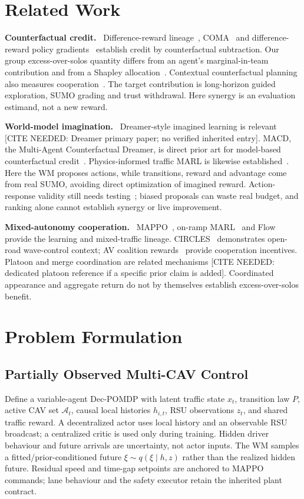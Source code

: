 \documentclass[conference]{IEEEtran}
\newcommand{\citeneeded}[1]{\textcolor{red!80!black}{[CITE NEEDED: #1]}}
\newcommand{\para}[1]{\noindent\textbf{#1}\ }
\begin{document}
\section{Related Work}
\para{Counterfactual credit.}
Difference-reward lineage~\cite{wolpert_tumer2002}, COMA~\cite{foerster_coma2018}
and difference-reward policy gradients~\cite{castellini_drreinforce}
establish credit by counterfactual subtraction. Our group excess-over-solos
quantity differs from an agent's marginal-in-team contribution and from a
Shapley allocation~\cite{han_shapley2022}. Contextual counterfactual planning
also measures cooperation~\cite{barnett_counterfactual2026}. The target
contribution is long-horizon guided exploration, SUMO grading and trust
withdrawal. Here synergy is an evaluation estimand, not a new reward.

\para{World-model imagination.}
Dreamer-style imagined learning is relevant
\citeneeded{Dreamer primary paper; no verified inherited entry}.
MACD, the Multi-Agent Counterfactual Dreamer, is direct prior art for
model-based counterfactual credit~\cite{chai_macd2024}.
Physics-informed traffic MARL is likewise established~\cite{liu_physics_wm2026}.
Here the WM proposes actions, while transitions, reward and advantage come
from real SUMO, avoiding direct optimization of imagined reward.
Action-response validity still needs testing~\cite{oefinger_validate2026};
biased proposals can waste real budget, and ranking alone cannot establish
synergy or live improvement.

\para{Mixed-autonomy cooperation.}
MAPPO~\cite{yu_mappo2022}, on-ramp MARL~\cite{chen_merge2021} and
Flow~\cite{wu_flow2022} provide the learning and mixed-traffic lineage.
CIRCLES~\cite{lee_circles2024} demonstrates open-road wave-control context;
AV coalition rewards~\cite{han_shapley2022} provide cooperation incentives.
Platoon and merge coordination are related mechanisms
\citeneeded{dedicated platoon reference if a specific prior claim is added}.
Coordinated appearance and aggregate return do not by themselves establish
excess-over-solos benefit.

\section{Problem Formulation}
\subsection{Partially Observed Multi-CAV Control}
Define a variable-agent Dec-POMDP with latent traffic state $x_t$, transition
law $P$, active CAV set $\mathcal A_t$, causal local histories $h_{i,t}$,
RSU observations $z_t$, and shared traffic reward. A decentralized actor uses
local history and an observable RSU broadcast; a centralized critic is used
only during training. Hidden driver behaviour and future arrivals are
uncertainty, not actor inputs. The WM samples a fitted/prior-conditioned
future $\xi\sim q(\xi\mid h,z)$ rather than the realized hidden future.
Residual speed and time-gap setpoints are anchored to MAPPO commands; lane
behaviour and the safety executor retain the inherited plant contract.
\end{document}
